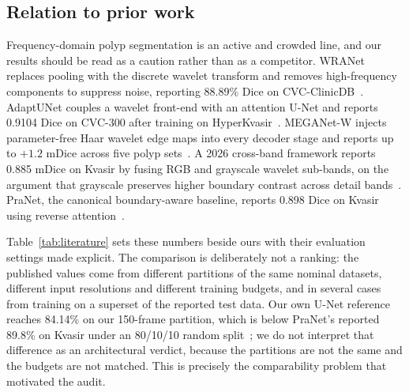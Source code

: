 \documentclass[journal]{IEEEtran}
\begin{document}
\subsection{Relation to prior work}

Frequency-domain polyp segmentation is an active and crowded line, and our results should be read as a caution rather than as a competitor. WRANet replaces pooling with the discrete wavelet transform and removes high-frequency components to suppress noise, reporting 88.89\% Dice on CVC-ClinicDB~\cite{zhao2023wranet}. AdaptUNet couples a wavelet front-end with an attention U-Net and reports 0.9104 Dice on CVC-300 after training on HyperKvasir~\cite{rajasekar2024adaptunet}. MEGANet-W injects parameter-free Haar wavelet edge maps into every decoder stage and reports up to $+1.2$ mDice across five polyp sets~\cite{yeemeganet2025}. A 2026 cross-band framework reports 0.885 mDice on Kvasir by fusing RGB and grayscale wavelet sub-bands, on the argument that grayscale preserves higher boundary contrast across detail bands~\cite{oh2026crossband}. PraNet, the canonical boundary-aware baseline, reports 0.898 Dice on Kvasir using reverse attention~\cite{fan2020pranet}.

Table~\ref{tab:literature} sets these numbers beside ours with their evaluation settings made explicit. The comparison is deliberately not a ranking: the published values come from different partitions of the same nominal datasets, different input resolutions and different training budgets, and in several cases from training on a superset of the reported test data. Our own U-Net reference reaches 84.14\% on our 150-frame partition, which is below PraNet's reported 89.8\% on Kvasir under an 80/10/10 random split~\cite{fan2020pranet}; we do not interpret that difference as an architectural verdict, because the partitions are not the same and the budgets are not matched. This is precisely the comparability problem that motivated the audit.
\end{document}

